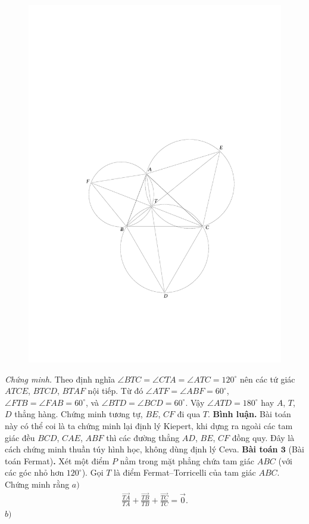 \begin{multicols}{2}
\begin{figure}[H]
		\includegraphics[width= 0.75\linewidth]{figure7793}
		\vspace*{-15pt}
	\end{figure}
	\textit{Chứng minh.} Theo định nghĩa $\angle BTC=\angle CTA=\angle ATC=120^\circ$ nên các tứ giác $ATCE$, $BTCD$, $BTAF$ nội tiếp. Từ đó $\angle ATF=\angle ABF=60^\circ$, $\angle FTB=\angle FAB=60^\circ$, và $\angle BTD=\angle BCD=60^\circ$. Vậy $\angle ATD=180^\circ$ hay $A$, $T$, $D$ thẳng hàng. Chứng minh tương tự, $BE$, $CF$ đi qua $T$.
	\vskip 0.1cm
	{\bf\color{cackithi} Bình luận.} Bài toán này có thể coi là ta chứng minh lại định lý Kiepert, khi dựng ra ngoài các tam giác đều $BCD$, $CAE$, $ABF$ thì các đường thẳng $AD$, $BE$, $CF$ đồng quy. Đây là cách chứng minh thuần túy hình học, không dùng định lý Ceva.
	\vskip 0.1cm
	\textbf{\color{cackithi}Bài toán $\pmb{3}$} (Bài toán Fermat)\textbf{\color{cackithi}.} Xét một điểm $P$ nằm trong mặt phẳng chứa tam giác $ABC$ (với các góc nhỏ hơn $120^\circ$). Gọi $T$ là điểm Fermat--Torricelli của tam giác $ABC$. Chứng minh rằng
	\vskip 0.1cm
	$a)$  \begin{align*}
		\frac{\overrightarrow{TA}}{TA}+\frac{\overrightarrow{TB}}{TB}+\frac{\overrightarrow{TC}}{TC}=\overrightarrow{0}.
	\end{align*}
	$b)$\begin{align*}

\end{align*}
\end{multicols}
